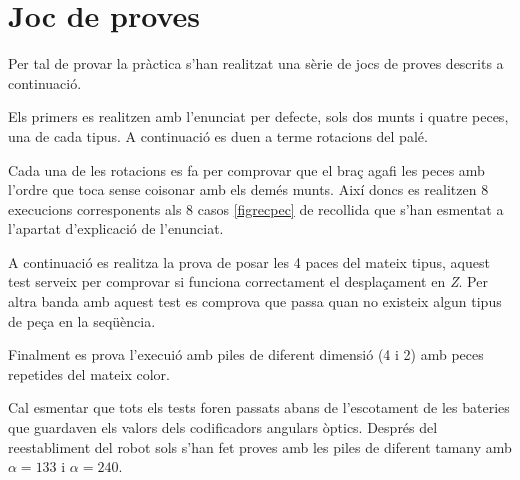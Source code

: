 \section{Joc de proves}

Per tal de provar la pràctica s'han realitzat una sèrie de jocs de proves
descrits a continuació.

Els primers es realitzen amb l'enunciat per defecte, sols dos munts i
quatre peces, una de cada tipus. A continuació es duen a terme rotacions
del palé.

Cada una de les rotacions es fa per comprovar que el braç agafi les
peces amb l'ordre que toca sense co\lgem isonar amb els demés munts.
Així doncs es realitzen 8 execucions corresponents als 8 casos
\ref{figrecpec} de recollida que s'han esmentat a l'apartat
d'explicació de l'enunciat.

A continuació es realitza la prova de posar les 4 paces del mateix tipus,
aquest test serveix per comprovar si funciona correctament el desplaçament
en \emph{Z}. Per altra banda amb aquest test es comprova que passa
quan no existeix algun tipus de peça en la seqüència.

Finalment es prova l'execuió amb piles de diferent dimensió (4 i 2)
amb peces repetides del mateix color.

Cal esmentar que tots els tests foren passats abans de l'escotament
de les bateries que guardaven els valors dels codificadors angulars
òptics. Després del reestabliment del robot sols s'han fet proves
amb les piles de diferent tamany amb $\alpha = 133$ i $\alpha = 240$.